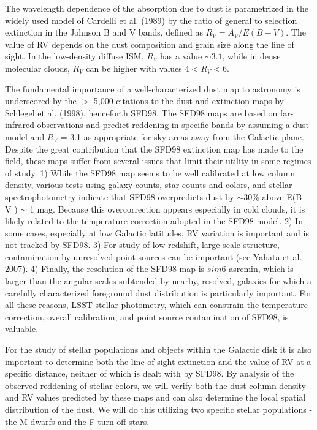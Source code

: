 The wavelength dependence of the absorption due to dust is parametrized in the widely used model
of Cardelli et al. (1989) by the ratio of general to selection extinction in the Johnson B and V
bands, defined as $R_V = A_V /E(B − V)$. The value of RV depends on the dust composition and
grain size along the line of sight. In the low-density diffuse ISM, $R_V$ has a value $\sim 3.1$, while in
dense molecular clouds, $R_V$ can be higher with values $4 < R_V < 6$.

The fundamental importance of a well-characterized dust map to astronomy is underscored by the
$>$ 5,000 citations to the dust and extinction maps by Schlegel et al. (1998), henceforth SFD98.
The SFD98 maps are based on far-infrared observations and predict reddening in specific bands by
assuming a dust model and $R_V$ = 3.1 as appropriate for sky areas away from the Galactic plane.
Despite the great contribution that the SFD98 extinction map has made to the field, these maps
suffer from several issues that limit their utility in some regimes of study. 1) While the SFD98
map seems to be well calibrated at low column density, various tests using galaxy counts, star
counts and colors, and stellar spectrophotometry indicate that SFD98 overpredicts dust by $\sim30\%$
above E(B − V ) $\sim$ 1 mag. Because this overcorrection appears especially in cold clouds, it is
likely related to the temperature correction adopted in the SFD98 model. 2) In some cases,
especially at low Galactic latitudes, RV variation is important and is not tracked by SFD98. 3)
For study of low-redshift, large-scale structure, contamination by unresolved point sources can be
important (see Yahata et al. 2007). 4) Finally, the resolution of the SFD98 map is $sim 6$ asrcmin, which
is larger than the angular scales subtended by nearby, resolved, galaxies for which a carefully
characterized foreground dust distribution is particularly important. For all these reasons, LSST
stellar photometry, which can constrain the temperature correction, overall calibration, and point
source contamination of SFD98, is valuable.

For the study of stellar populations and objects within the Galactic disk it is also important to
determine both the line of sight extinction and the value of RV at a specific distance, neither of
which is dealt with by SFD98. By analysis of the observed reddening of stellar colors, we will verify
both the dust column density and RV values predicted by these maps and can also determine the
local spatial distribution of the dust. We will do this utilizing two specific stellar populations - the
M dwarfs and the F turn-off stars.

